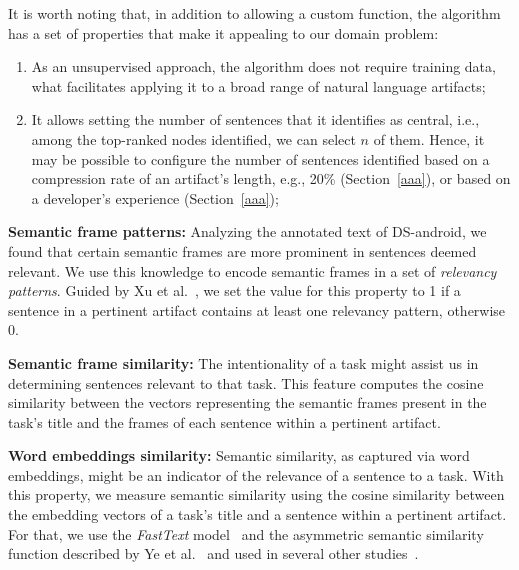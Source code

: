 It is worth noting that,
in addition to allowing a custom function, the algorithm has a set of properties that make it appealing to our domain problem:



\begin{enumerate}
    
    \item As an unsupervised approach, the algorithm does not require training data, what facilitates applying it to a broad range of natural language artifacts;

    \item It allows setting the number of sentences that it identifies as central, i.e., among the top-ranked nodes identified, we can select $n$ of them. Hence, 
    it may be possible to configure the number of sentences identified based on 
    a compression rate of an artifact's length, e.g., 20\% (Section~\ref{aaa}), or 
    based on a developer's experience (Section~\ref{aaa});
    
\end{enumerate}




\vspace{3mm}
\begin{hangparas}{1em}{1}
    \textbf{Semantic frame patterns:} Analyzing the annotated text of \acs{DS-android}, 
    we found that certain semantic frames are more prominent in sentences deemed relevant.
    We use this knowledge to encode semantic frames in a set of \textit{relevancy patterns}. 
    Guided by Xu et al.~\cite{Xu2017}, we set the value for this property to 1 if a sentence in a pertinent artifact contains at least one relevancy pattern, otherwise 0.
\end{hangparas}


\vspace{3mm}
\begin{hangparas}{1em}{1}
    \textbf{Semantic frame similarity:} The intentionality of a task might assist us in determining sentences relevant to that task. 
    This feature computes the cosine similarity between the vectors representing the semantic frames present in the task's title and the frames of each sentence within a pertinent artifact. 
\end{hangparas}


\vspace{3mm}
\begin{hangparas}{1em}{1}
    \textbf{Word embeddings similarity:} Semantic similarity, as captured via word embeddings, might be an indicator of the relevance of a sentence to a task. With this property, we measure semantic similarity using the cosine similarity between the embedding vectors of a task's title and a sentence within a pertinent artifact. 
    For that, we use the \textit{FastText} model~\cite{bojanowski2017FastText} and the asymmetric semantic similarity function described by Ye et al.~\cite{Ye2016} and used in several other studies~\cite{Huang2018, Xu2017, silva2019}.
\end{hangparas}
